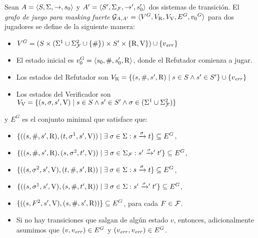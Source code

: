 \begin{defi} \label{def:strong_masking_game_graph}
  Sean $A=\langle S, \Sigma, \rightarrow, s_0 \rangle$ y $A'=\langle S',
  \Sigma_{\mathcal{F}}, \rightarrow', s'_0 \rangle$ dos sistemas de transición.
  El \emph{grafo de juego para masking fuerte} 
  $\mathcal{G}_{A, A'} = \langle V^G, V_{\mathrm{R}}, V_{\mathrm{V}}, E^G, {v_0}^G \rangle$ 
  para dos jugadores se define de la siguiente manera:

\begin{itemize}
  \item $V^G = (S \times ( \Sigma^1 \cup \Sigma_{\mathcal{F}}^2 \cup\{\#\}) \times S' \times \{ \mathrm{R}, \mathrm{V} \}) 
  \cup \{v_{\mathit{err}}\}$
  \item El estado inicial es $v_0^G = \langle s_0, \#, s'_0, \mathrm{R} \rangle$, donde el Refutador comienza a jugar.
  \item Los estados del Refutador son $V_{\mathrm{R}} = \{ (s, \#, s', \mathrm{R}) \mid s \in S \wedge s' \in S' \} 
  \cup \{v_{\mathit{err}}\}$
  \item Los estados del Verificador son $V_{\mathrm{V}} = \{ (s, \sigma, s', \mathrm{V}) \mid s \in S \wedge s' \in S' \wedge \sigma \in ( \Sigma^1 \cup \Sigma_{\mathcal{F}}^2 )\}$
\end{itemize}
y $E^G$ es el conjunto minimal que satisface que:
\begin{itemize}
  \item $\{ ( (s, \#, s', \mathrm{R}) , (t, \sigma^{1}, s', \mathrm{V})) \mid \exists\;\sigma \in \Sigma: s \xrightarrow{\sigma} t \} \subseteq E^G$,

  \item $\{ ((s, \#, s', \mathrm{R}), (s, \sigma^{2}, t', \mathrm{V}))  \mid \exists\;\sigma \in \Sigma_{\mathcal{F}}: s' \mathrel{{\xrightarrow[]{\sigma}}{}'} t' \} \subseteq E^G$,

  \item $\{ ((s, \sigma^2, s', \mathrm{V}), (t, \#, s', \mathrm{R})) \mid \exists\;\sigma \in \Sigma: s \xrightarrow{\sigma} t \} \subseteq E^G$,

  \item $\{ ((s, \sigma^1, s', \mathrm{V}), (s, \#, t', \mathrm{R})) \mid \exists\;\sigma \in \Sigma: s' \mathrel{{\xrightarrow[]{\sigma}}{}'} t' \} \subseteq E^G$,

  \item $\{ ((s, F^2, s', \mathrm{V}), (s, \#, s', \mathrm{R})) \} \subseteq E^G$, para cada $F \in \mathcal{F}$. 

  \item Si no hay transiciones que salgan de algún estado $v$, entonces, adicionalmente asumimos que $(v, v_{\mathit{err}}) \in E^G$ y $(v_{\mathit{err}}, v_{\mathit{err}}) \in E^G$.
\end{itemize}

\end{defi}

